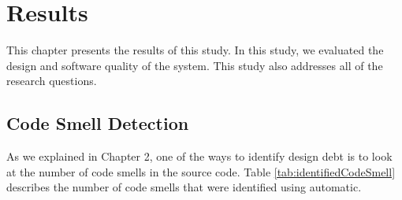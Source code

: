 
\chapter{Results}

This chapter presents the results of this study. 
In this study, we evaluated the design and software quality of the system. This study also addresses all of the research questions. 




\section{Code Smell Detection}
\label{sub:code_smell_detection}
As we explained in Chapter 2, one of the ways to identify design debt is to look at the number of code smells in the source code. Table \ref{tab:identifiedCodeSmell} describes the number of code smells that were identified using automatic.

